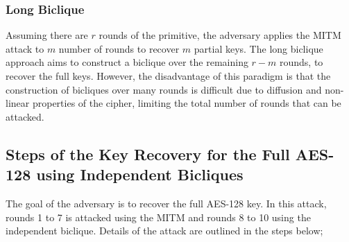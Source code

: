 \documentclass{report}
\begin{document}
 \subsubsection{Long Biclique}
 Assuming there are $r$ rounds of the primitive, the adversary applies the MITM attack to $m$ number of rounds to recover $m$ partial keys. The long biclique approach aims to construct a biclique over the remaining $r-m$ rounds, to recover the full keys. However, the disadvantage of this paradigm is that the construction of bicliques over many rounds is difficult due to diffusion and non-linear properties of the cipher, limiting the total number of rounds that can be attacked.


 \subsection{Steps of the Key Recovery for the Full AES-128 using Independent Bicliques}
The goal of the adversary is to recover the full AES-128 key. In this attack, rounds 1 to 7 is attacked using the MITM and rounds 8 to 10 using the independent biclique. Details of the attack are outlined in the steps below; 
\end{document}
